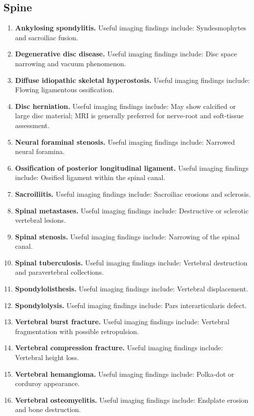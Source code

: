 \subsection{Spine}
\begin{enumerate}[leftmargin=*,itemsep=0.45em,topsep=0.4em]
\item \textbf{Ankylosing spondylitis.} Useful imaging findings include: Syndesmophytes and sacroiliac fusion.
\item \textbf{Degenerative disc disease.} Useful imaging findings include: Disc space narrowing and vacuum phenomenon.
\item \textbf{Diffuse idiopathic skeletal hyperostosis.} Useful imaging findings include: Flowing ligamentous ossification.
\item \textbf{Disc herniation.} Useful imaging findings include: May show calcified or large disc material; MRI is generally preferred for nerve-root and soft-tissue assessment.
\item \textbf{Neural foraminal stenosis.} Useful imaging findings include: Narrowed neural foramina.
\item \textbf{Ossification of posterior longitudinal ligament.} Useful imaging findings include: Ossified ligament within the spinal canal.
\item \textbf{Sacroiliitis.} Useful imaging findings include: Sacroiliac erosions and sclerosis.
\item \textbf{Spinal metastases.} Useful imaging findings include: Destructive or sclerotic vertebral lesions.
\item \textbf{Spinal stenosis.} Useful imaging findings include: Narrowing of the spinal canal.
\item \textbf{Spinal tuberculosis.} Useful imaging findings include: Vertebral destruction and paravertebral collections.
\item \textbf{Spondylolisthesis.} Useful imaging findings include: Vertebral displacement.
\item \textbf{Spondylolysis.} Useful imaging findings include: Pars interarticularis defect.
\item \textbf{Vertebral burst fracture.} Useful imaging findings include: Vertebral fragmentation with possible retropulsion.
\item \textbf{Vertebral compression fracture.} Useful imaging findings include: Vertebral height loss.
\item \textbf{Vertebral hemangioma.} Useful imaging findings include: Polka-dot or corduroy appearance.
\item \textbf{Vertebral osteomyelitis.} Useful imaging findings include: Endplate erosion and bone destruction.
\end{enumerate}

